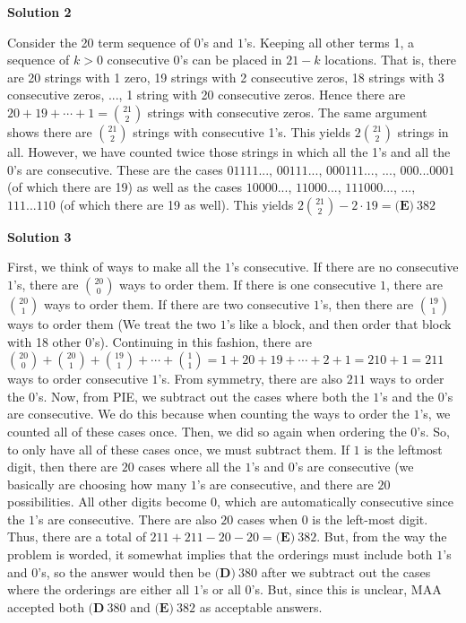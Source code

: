 \begin{enumerate}
\textbf{Solution 2}

Consider the 20 term sequence of $0$'s and $1$'s.  Keeping all other terms 1, a sequence of $k>0$ consecutive 0's can be placed in $21-k$ locations. That is, there are 20 strings with 1 zero, 19 strings with 2 consecutive zeros, 18 strings with 3 consecutive zeros, ..., 1 string with 20 consecutive zeros. Hence there are $20+19+\cdots+1=\binom{21}{2}$ strings with consecutive zeros. The same argument shows there are $\binom{21}{2}$ strings with consecutive 1's. This yields $2\binom{21}{2}$ strings in all. However, we have counted twice those strings in which all the 1's and all the 0's are consecutive. These are the cases $01111...$, $00111...$, $000111...$, ..., $000...0001$ (of which there are 19) as well as the cases $10000...$, $11000...$, $111000...$, ..., $111...110$ (of which there are 19 as well). This yields $2\binom{21}{2}-2\cdot19=\boxed{\textbf{(E)}\ 382}$




\textbf{Solution 3}

First, we think of ways to make all the $1$'s consecutive. If there are no consecutive $1$'s, there are $\binom{20}{0}$ ways to order them. If there is one consecutive $1$, there are $\binom{20}{1}$ ways to order them. If there are two consecutive $1$'s, then there are $\binom{19}{1}$ ways to order them (We treat the two $1$'s like a block, and then order that block with 18 other $0$'s). Continuing in this fashion, there are $\binom{20}{0} + \binom{20}{1} + \binom{19}{1} + \cdots + \binom{1}{1} = 1 + 20 + 19 + \cdots + 2 + 1 = 210 + 1 = 211$ ways to order consecutive $1$'s. From symmetry, there are also $211$ ways to order the $0$'s. Now, from PIE, we subtract out the cases where both the $1$'s and the $0$'s are consecutive. We do this because when counting the ways to order the $1$'s, we counted all of these cases once. Then, we did so again when ordering the $0$'s. So, to only have all of these cases once, we must subtract them. If $1$ is the leftmost digit, then there are $20$ cases where all the $1$'s and $0$'s are consecutive (we basically are choosing how many $1$'s are consecutive, and there are $20$ possibilities. All other digits become $0$, which are automatically consecutive since the $1$'s are consecutive. There are also $20$ cases when $0$ is the left-most digit. Thus, there are a total of $211 + 211 - 20 - 20 = \boxed{\textbf{(E)}\ 382}$. But, from the way the problem is worded, it somewhat implies that the orderings must include both $1$'s and $0$'s, so the answer would then be $\boxed{\textbf{(D)}\ 380}$ after we subtract out the cases where the orderings are either all $1$'s or all $0$'s. But, since this is unclear, MAA accepted both $\boxed{\textbf{(D}\ 380}$ and $\boxed{\textbf{(E)}\ 382}$ as acceptable answers.


\end{enumerate}
